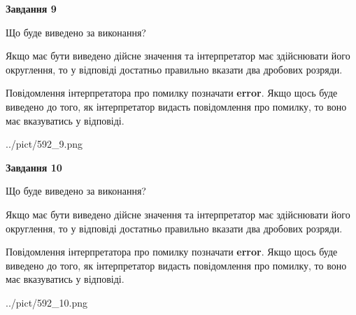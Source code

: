 \documentclass[12pt, ukrainian]{article}
\begin{document}
{\begin {Large}
{\begin {center}\textbf{Завдання 9}\end {center}}\par
Що буде виведено за виконання? \par

Якщо має бути виведено дійсне значення та інтерпретатор має здійснювати його округлення, 
то у відповіді достатньо правильно вказати два дробових розряди.

Повідомлення інтерпретатора про помилку позначати \textbf{error}.
Якщо щось буде виведено до того, як інтерпретатор видасть повідомлення про помилку, 
то воно має вказуватись у відповіді. \par

\begin{center}
	{../pict/592_9.png}
\end{center}
\newpage

{\begin {center}\textbf{Завдання 10}\end {center}}\par
Що буде виведено за виконання? \par

Якщо має бути виведено дійсне значення та інтерпретатор має здійснювати його округлення, 
то у відповіді достатньо правильно вказати два дробових розряди.

Повідомлення інтерпретатора про помилку позначати \textbf{error}.
Якщо щось буде виведено до того, як інтерпретатор видасть повідомлення про помилку, 
то воно має вказуватись у відповіді. \par

\begin{center}
	{../pict/592_10.png}
\end{center}
\newpage

\end {Large}}
\end{document}
